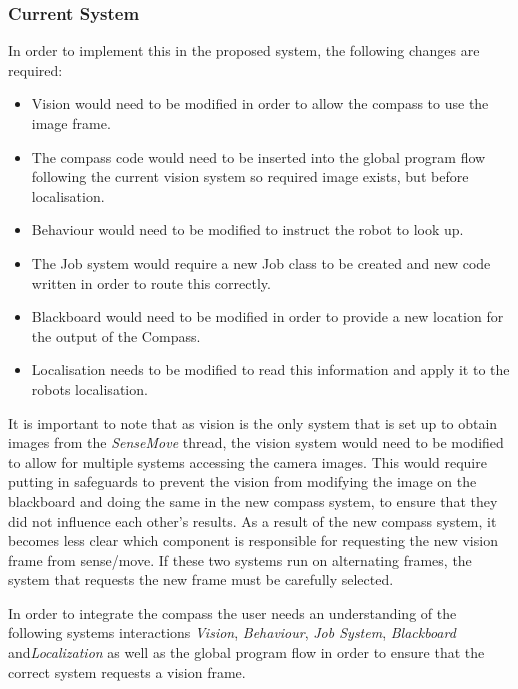 \documentclass[english,12pt]{scrartcl}
\begin{document}
			\subsubsection{Current System}
				In order to implement this in the proposed system, the following changes are required:
				
				\begin{itemize}
					\item Vision would need to be modified in order to allow the compass to use the image frame.
					\item The compass code would need to be inserted into the global program flow following the current vision system so required image exists, but before localisation.
					\item Behaviour would need to be modified to instruct the robot to look up.
					\item The Job system would require a new Job class to be created and new code written in order to route this correctly.
					\item Blackboard would need to be modified in order to provide a new location for the output of the Compass.
					\item Localisation needs to be modified to read this information and apply it to the robots localisation.
				\end{itemize}
			
				It is important to note that as vision is the only system that is set up to obtain images from the \emph{SenseMove} thread, the vision system would need to be modified to allow for multiple systems accessing the camera images.
				This would require putting in safeguards to prevent the vision from modifying the image on the blackboard and doing the same in the new compass system, to ensure that they did not influence each other’s results.
				As a result of the new compass system, it becomes less clear which component is responsible for requesting the new vision frame from sense/move.
				If these two systems run on alternating frames, the system that requests the new frame must be carefully selected.
				
				In order to integrate the compass the user needs an understanding of the following systems interactions \emph{Vision}, \emph{Behaviour}, \emph{Job System}, \emph{Blackboard} and\emph{Localization} as well as the global program flow in order to ensure that the correct system requests a vision frame.
				
\end{document}
